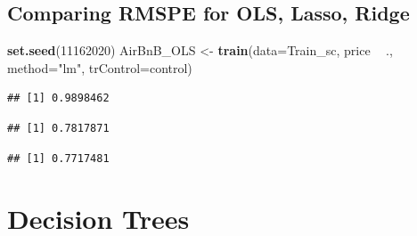 \documentclass[]{book}
\newenvironment{Shaded}{\begin{snugshade}}{\end{snugshade}}
\newcommand{\KeywordTok}[1]{\textcolor[rgb]{0.13,0.29,0.53}{\textbf{#1}}}
\newcommand{\DataTypeTok}[1]{\textcolor[rgb]{0.13,0.29,0.53}{#1}}
\newcommand{\DecValTok}[1]{\textcolor[rgb]{0.00,0.00,0.81}{#1}}
\newcommand{\StringTok}[1]{\textcolor[rgb]{0.31,0.60,0.02}{#1}}
\newcommand{\OperatorTok}[1]{\textcolor[rgb]{0.81,0.36,0.00}{\textbf{#1}}}
\newcommand{\NormalTok}[1]{#1}
\begin{document}
\subsection{Comparing RMSPE for OLS, Lasso,
Ridge}\label{comparing-rmspe-for-ols-lasso-ridge}

\begin{Shaded}
\begin{Highlighting}[]
\KeywordTok{set.seed}\NormalTok{(}\DecValTok{11162020}\NormalTok{)}
\NormalTok{AirBnB_OLS <-}\StringTok{ }\KeywordTok{train}\NormalTok{(}\DataTypeTok{data=}\NormalTok{Train_sc, price }\OperatorTok{~}\StringTok{ }\NormalTok{.,  }\DataTypeTok{method=}\StringTok{"lm"}\NormalTok{, }\DataTypeTok{trControl=}\NormalTok{control)}
\end{Highlighting}
\end{Shaded}

\begin{Shaded}
\end{Shaded}

\begin{verbatim}
## [1] 0.9898462
\end{verbatim}

\begin{Shaded}
\end{Shaded}

\begin{verbatim}
## [1] 0.7817871
\end{verbatim}

\begin{Shaded}
\end{Shaded}

\begin{verbatim}
## [1] 0.7717481
\end{verbatim}

\section{Decision Trees}\label{decision-trees}
\end{document}
